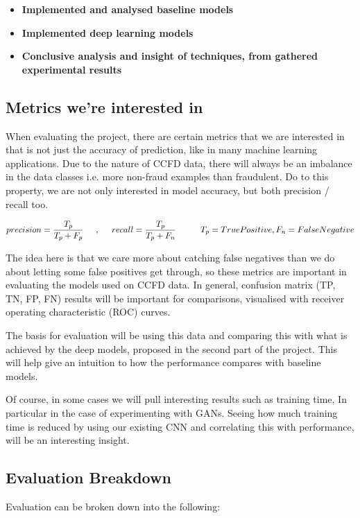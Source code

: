 \documentclass[12pt,a4paper,twoside]{article}
\begin{document}
\begin{itemize}
\item
	\textbf{Implemented and analysed baseline models }
\item
	\textbf{Implemented deep learning models }
\item
	\textbf{Conclusive analysis and insight of techniques, from gathered experimental results }
\end{itemize}

\subsection*{Metrics we're interested in}
When evaluating the project, there are certain metrics that we are interested in that is not just the accuracy of prediction, like in many machine learning applications. Due to the nature of CCFD data, there will always be an imbalance in the data classes i.e. more non-fraud examples than fraudulent. Do to this property, we are not only interested in model accuracy, but both precision / recall too. 

\[
    {precision} = \frac{T_p}{T_p+F_p} \hspace{5mm} , \hspace{5mm} {recall} = \frac{T_p}{T_p+F_n} \hspace{1cm}  {T_p} = {True Positive}, {F_n} = {False Negative}
\]

 
 The idea here is that we care more about catching false negatives than we do about letting some false positives get through, so these metrics are important in evaluating the models used on CCFD data. 
In general, confusion matrix (TP, TN, FP, FN) results will be important for comparisons, visualised with receiver operating characteristic (ROC) curves. 

The basis for evaluation will be using this data and comparing this with what is achieved by the deep models, proposed in the second part of the project. This will help give an intuition to how the performance compares with baseline models. 

Of course, in some cases we will pull interesting results such as training time, In particular in the case of experimenting with GANs. Seeing how much training time is reduced by using our existing CNN and correlating this with performance, will be an interesting insight.
\pagebreak
\subsection*{Evaluation Breakdown}
Evaluation can be broken down into the following:
\end{document}
